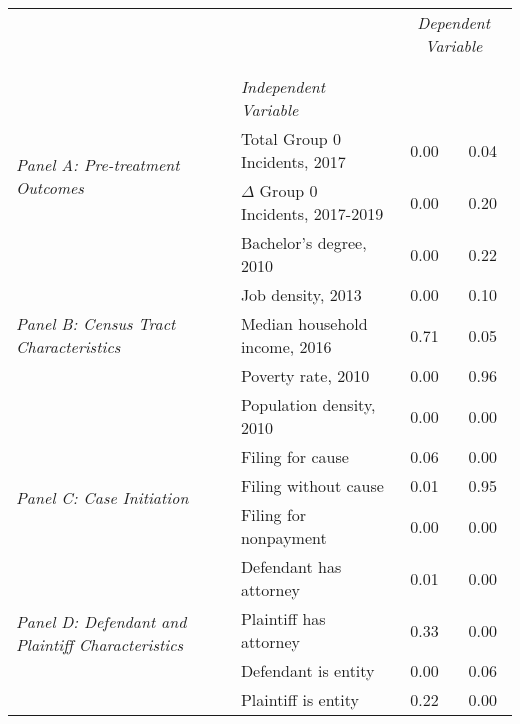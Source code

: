 \begin{tabular}{llcc}
\toprule
 &  & \multicolumn{2}{c}{\textit{Dependent Variable}} \\
\cline{3-4}
\\
 &  &  &  \\
 & \emph{Independent Variable} &  &  \\
\midrule
\multirow[c]{2}{3cm}{\textit{Panel A: Pre-treatment Outcomes}} & Total Group 0 Incidents, 2017 & 0.00 & 0.04 \\
 & $\Delta$ Group 0 Incidents, 2017-2019 & 0.00 & 0.20 \\
\cline{1-4}
\multirow[c]{5}{3cm}{\textit{Panel B: Census Tract Characteristics}} & Bachelor's degree, 2010 & 0.00 & 0.22 \\
 & Job density, 2013 & 0.00 & 0.10 \\
 & Median household income, 2016 & 0.71 & 0.05 \\
 & Poverty rate, 2010 & 0.00 & 0.96 \\
 & Population density, 2010 & 0.00 & 0.00 \\
\cline{1-4}
\multirow[c]{3}{3cm}{\textit{Panel C: Case Initiation}} & Filing for cause & 0.06 & 0.00 \\
 & Filing without cause & 0.01 & 0.95 \\
 & Filing for nonpayment & 0.00 & 0.00 \\
\cline{1-4}
\multirow[c]{4}{3cm}{\textit{Panel D: Defendant and Plaintiff Characteristics}} & Defendant has attorney & 0.01 & 0.00 \\
 & Plaintiff has attorney & 0.33 & 0.00 \\
 & Defendant is entity & 0.00 & 0.06 \\
 & Plaintiff is entity & 0.22 & 0.00 \\
\cline{1-4}
\bottomrule
\end{tabular}
